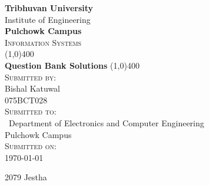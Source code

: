 \documentclass[12pt]{article}
\begin{document}
\begin{titlepage}
    \begin{center}
        \huge{\bfseries  Tribhuvan University}\\
        \Large{Institute of Engineering}\\
        \huge{ \bfseries  Pulchowk Campus}\\[3.2cm]


        \textsc{\Large Information Systems}\\[-0.5cm]
        \line(1,0){400}\\
        \huge{\bfseries Question Bank Solutions}
        \line(1,0){400}\\


        \textsc{\Large Submitted by:}\\
        \Large Bishal Katuwal\\ \large 075BCT028\\    [0.85cm]

        \textsc{\Large Submitted to:}\\\
        \large Department of Electronics and Computer Engineering\\Pulchowk Campus\\    [0.85cm]
        
        \textsc{\Large Submitted on:}\\
        \today
        
    \end{center}
\end{titlepage}
\pagebreak
{\Large 2079 Jestha}
\end{document}
